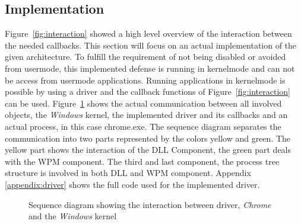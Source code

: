 \subsection{Implementation}
\label{sec:implementation} 
Figure~\ref{fig:interaction} showed a high level overview of the interaction between the needed callbacks. This section will focus on an actual implementation of the given architecture. To fulfill the requirement of not being disabled or avoided from usermode, this implemented defense is running in kernelmode and can not be access from usermode applications. Running applications in kernelmode is possible by using a driver and the callback functions of Figure~\ref{fig:interaction} can be used. Figure~\ref{fig:sequence} shows the actual communication between all involved objects, the \emph{Windows} kernel, the implemented driver and its callbacks and an actual process, in this case chrome.exe. The sequence diagram separates the communication into two parts represented by the colors yellow and green. The yellow part shows the interaction of the \gls{DLL} Component, the green part deals with the \gls{WPM} component. The third and last component, the process tree structure is involved in both \gls{DLL} and \gls{WPM} component. Appendix \ref{appendix:driver} shows the full code used for the implemented driver.
\begin{figure}[h] 
 \centering
\caption{Sequence diagram showing the interaction between driver, \emph{Chrome} and the \emph{Windows} kernel}
\label{fig:sequence}
\end{figure}
\restoregeometry
